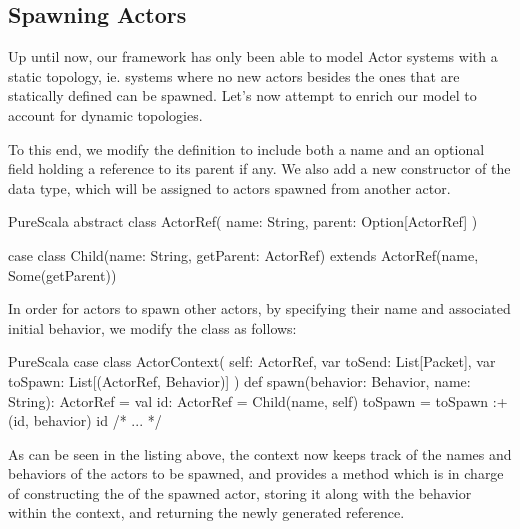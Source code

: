 %

%

\subsection{Spawning Actors}
\label{spawn}


Up until now, our framework has only been able to model Actor systems with a static topology, ie. systems where no new actors besides the ones that are statically defined can be spawned. Let's now attempt to enrich our model to account for dynamic topologies.

To this end, we modify the \ActorRef definition to include both a name and an optional field holding a reference to its parent \ActorRef if any. We also add a new constructor of the \ActorRef data type, which will be assigned to actors spawned from another actor.

\begin{ShortCode}{PureScala}
abstract class ActorRef(
  name: String,
  parent: Option[ActorRef]
)

case class Child(name: String, getParent: ActorRef)
  extends ActorRef(name, Some(getParent))
\end{ShortCode}

In order for actors to spawn other actors, by specifying their name and associated 
initial behavior, we modify the  class as follows:

\begin{ShortCode}{PureScala}
case class ActorContext(
  self: ActorRef,
  var toSend: List[Packet],
  var toSpawn: List[(ActorRef, Behavior)]
) {
  def spawn(behavior: Behavior, name: String): ActorRef = {
    val id: ActorRef = Child(name, self)
    toSpawn = toSpawn :+ (id, behavior)
    id
  }
  /* ... */
}
\end{ShortCode}

As can be seen in the listing above, the context now keeps track of the names and 
behaviors of the actors to be spawned, and provides a  method which is in 
charge of constructing the \ActorRef of the spawned actor, storing it along with the 
behavior within the context, and returning the newly generated reference.

